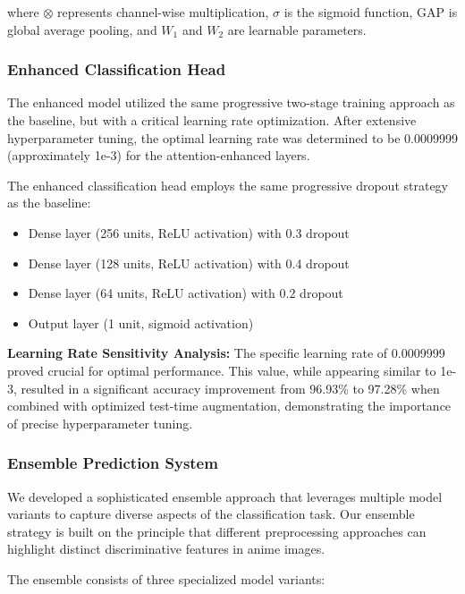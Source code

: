 \documentclass{article}
\begin{document}
where $\otimes$ represents channel-wise multiplication, $\sigma$ is the sigmoid function, GAP is global average pooling, and $W_1$ and $W_2$ are learnable parameters.

\subsubsection{Enhanced Classification Head}

The enhanced model utilized the same progressive two-stage training approach as the baseline, but with a critical learning rate optimization. After extensive hyperparameter tuning, the optimal learning rate was determined to be 0.0009999 (approximately 1e-3) for the attention-enhanced layers.

The enhanced classification head employs the same progressive dropout strategy as the baseline:
\begin{itemize}
    \item Dense layer (256 units, ReLU activation) with 0.3 dropout
    \item Dense layer (128 units, ReLU activation) with 0.4 dropout
    \item Dense layer (64 units, ReLU activation) with 0.2 dropout
    \item Output layer (1 unit, sigmoid activation)
\end{itemize}

\textbf{Learning Rate Sensitivity Analysis:} The specific learning rate of 0.0009999 proved crucial for optimal performance. This value, while appearing similar to 1e-3, resulted in a significant accuracy improvement from 96.93\% to 97.28\% when combined with optimized test-time augmentation, demonstrating the importance of precise hyperparameter tuning.

\subsubsection{Ensemble Prediction System}

We developed a sophisticated ensemble approach that leverages multiple model variants to capture diverse aspects of the classification task. Our ensemble strategy is built on the principle that different preprocessing approaches can highlight distinct discriminative features in anime images.

The ensemble consists of three specialized model variants:
\end{document}
